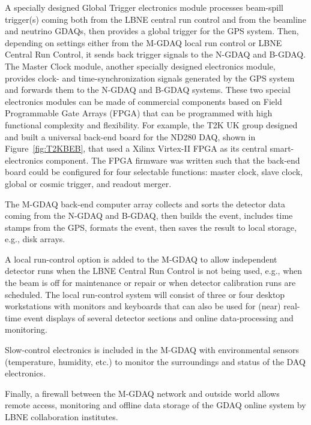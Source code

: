 A specially designed Global Trigger electronics module processes 
beam-spill trigger(s) coming 
both from the LBNE central run control and from the beamline and neutrino GDAQs,
then provides a global trigger for 
the GPS system. 
Then, 
depending on settings either from the M-GDAQ local run control or LBNE 
Central Run Control, it sends back trigger signals to the N-GDAQ and B-GDAQ.  
The Master Clock module, another specially 
designed electronics module, provides clock- and time-synchronization 
signals generated by the GPS system and forwards them to the N-GDAQ and 
B-GDAQ systems.  These two special electronics modules can be made of 
commercial components based on Field Programmable Gate Arrays (FPGA) 
that can be programmed with high functional complexity and flexibility. 
For example, the T2K UK group designed and built a universal back-end board for 
the ND280 DAQ, shown in Figure~\ref{fig:T2KBEB}, that used a Xilinx Virtex-II 
FPGA as its central smart-electronics component. The FPGA firmware was 
written such that the back-end board could be configured for four 
selectable functions: master clock, slave clock, global or cosmic 
trigger, and readout merger.

The M-GDAQ back-end computer array collects and sorts the detector data 
coming from the N-GDAQ and B-GDAQ, then builds the event, includes 
time stamps from the GPS, formats the event, then %
saves the 
result to local storage, e.g., disk arrays.

A local run-control option is added to the M-GDAQ %
to allow independent 
detector runs when the LBNE Central Run Control is not being used, e.g.,  
when the beam is off for maintenance or repair or when detector 
calibration runs are scheduled. The local run-control system will consist of three or four 
desktop workstations with monitors and keyboards that can also be used 
for (near) real-time event displays of several detector sections and 
online data-processing and monitoring.

Slow-control electronics is included in the M-GDAQ  %
with environmental 
sensors (temperature, humidity, etc.) to monitor the surroundings and 
status of the DAQ electronics.

Finally, a firewall between the M-GDAQ  %
network and outside world allows 
remote access, monitoring and offline data storage of the GDAQ online 
system by LBNE collaboration institutes.

